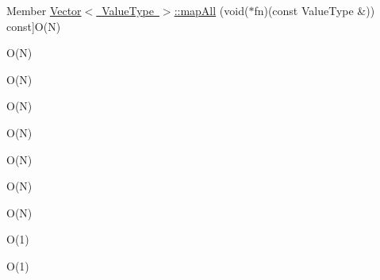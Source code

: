 \begin{DoxyRefList}
Member \mbox{\hyperlink{classVector_a395b81e6a77aa9702362198771785dfd}{Vector$<$ Value\+Type $>$\+:\+:map\+All}} (void($\ast$fn)(const Value\+Type \&)) const]O(\+N)  
\item[\label{BigOh__BigOh000120}%
\Hypertarget{BigOh__BigOh000120}%
Member \mbox{\hyperlink{classVector_a2931bda025b4800f128f37790d21f49f}{Vector$<$ Value\+Type $>$\+:\+:map\+All}} (void($\ast$fn)(Value\+Type)) const]O(\+N)  
\item[\label{BigOh__BigOh000122}%
\Hypertarget{BigOh__BigOh000122}%
Member \mbox{\hyperlink{classVector_a8dc32c1e45704cfae41daf8adb4e66dc}{Vector$<$ Value\+Type $>$\+:\+:map\+All}} (Functor\+Type fn) const]O(\+N)  
\item[\label{BigOh__BigOh000147}%
\Hypertarget{BigOh__BigOh000147}%
Member \mbox{\hyperlink{classVector_a3e96c4b5c89d1b00f587b521874cd0d8}{Vector$<$ Value\+Type $>$\+:\+:operator!=}} (const \mbox{\hyperlink{classVector}{Vector}} \&v2) const]O(\+N)  
\item[\label{BigOh__BigOh000141}%
\Hypertarget{BigOh__BigOh000141}%
Member \mbox{\hyperlink{classVector_acb70fcd67f846bf16b96223bcf43e476}{Vector$<$ Value\+Type $>$\+:\+:operator+}} (const \mbox{\hyperlink{classVector}{Vector}} \&v2) const]O(\+N)  
\item[\label{BigOh__BigOh000142}%
\Hypertarget{BigOh__BigOh000142}%
Member \mbox{\hyperlink{classVector_a2dce2988ba5880d744280b4bbf85b135}{Vector$<$ Value\+Type $>$\+:\+:operator+}} (std\+::initializer\+\_\+list$<$ Value\+Type $>$ list) const]O(\+N)  
\item[\label{BigOh__BigOh000144}%
\Hypertarget{BigOh__BigOh000144}%
Member \mbox{\hyperlink{classVector_a22e55ed53bfa2da64ecd22b36757fcea}{Vector$<$ Value\+Type $>$\+:\+:operator+=}} (std\+::initializer\+\_\+list$<$ Value\+Type $>$ list)]O(\+N)  
\item[\label{BigOh__BigOh000143}%
\Hypertarget{BigOh__BigOh000143}%
Member \mbox{\hyperlink{classVector_a6b35f98e0e64a2fff6891a8806f640fd}{Vector$<$ Value\+Type $>$\+:\+:operator+=}} (const \mbox{\hyperlink{classVector}{Vector}} \&v2)]O(\+N)  
\item[\label{BigOh__BigOh000145}%
\Hypertarget{BigOh__BigOh000145}%
Member \mbox{\hyperlink{classVector_afded71b2a6d6df8b0257cbfd8f7e8d5f}{Vector$<$ Value\+Type $>$\+:\+:operator+=}} (const Value\+Type \&value)]O(1)  
\item[\label{BigOh__BigOh000154}%
\Hypertarget{BigOh__BigOh000154}%
Member \mbox{\hyperlink{classVector_ad2a2f86bb5857209608bbbfe1066c650}{Vector$<$ Value\+Type $>$\+:\+:operator,}} (const Value\+Type \&value)]O(1)  

\end{DoxyRefList}
